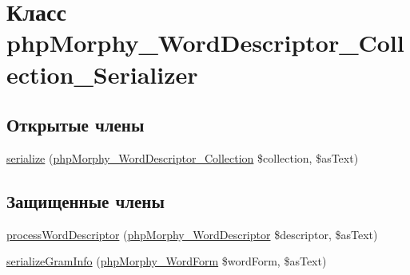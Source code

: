 \hypertarget{classphpMorphy__WordDescriptor__Collection__Serializer}{
\section{Класс phpMorphy\_\-WordDescriptor\_\-Collection\_\-Serializer}
\label{classphpMorphy__WordDescriptor__Collection__Serializer}
}
\subsection*{Открытые члены}
\begin{DoxyCompactItemize}
\item 
\hyperlink{classphpMorphy__WordDescriptor__Collection__Serializer_af36b37f691bcab22dd6b723bf13caa68}{serialize} (\hyperlink{classphpMorphy__WordDescriptor__Collection}{phpMorphy\_\-WordDescriptor\_\-Collection} \$collection, \$asText)
\end{DoxyCompactItemize}
\subsection*{Защищенные члены}
\begin{DoxyCompactItemize}
\item 
\hyperlink{classphpMorphy__WordDescriptor__Collection__Serializer_add8fca6aaea81e9afa674c53c614db2a}{processWordDescriptor} (\hyperlink{classphpMorphy__WordDescriptor}{phpMorphy\_\-WordDescriptor} \$descriptor, \$asText)
\item 
\hyperlink{classphpMorphy__WordDescriptor__Collection__Serializer_a9663620ce68eb8b5edd9f18be18eea3b}{serializeGramInfo} (\hyperlink{classphpMorphy__WordForm}{phpMorphy\_\-WordForm} \$wordForm, \$asText)
\end{DoxyCompactItemize}


